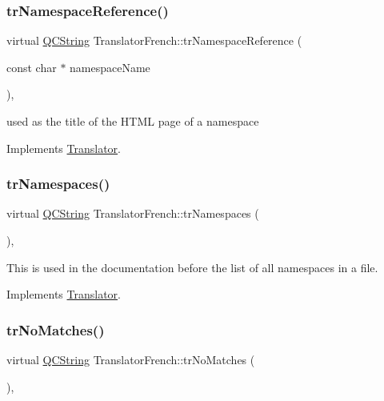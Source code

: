 \subsubsection{\texorpdfstring{trNamespaceReference()}{trNamespaceReference()}}
{\footnotesize\ttfamily virtual \mbox{\hyperlink{class_q_c_string}{Q\+C\+String}} Translator\+French\+::tr\+Namespace\+Reference (\begin{DoxyParamCaption}\item[{const char $\ast$}]{namespace\+Name }\end{DoxyParamCaption})\hspace{0.3cm}{\ttfamily [inline]}, {\ttfamily [virtual]}}

used as the title of the H\+T\+ML page of a namespace 

Implements \mbox{\hyperlink{class_translator}{Translator}}.

\mbox{\label{class_translator_french_ad269ac85f148854cc36b48693a18ab6b}} 
\subsubsection{\texorpdfstring{trNamespaces()}{trNamespaces()}}
{\footnotesize\ttfamily virtual \mbox{\hyperlink{class_q_c_string}{Q\+C\+String}} Translator\+French\+::tr\+Namespaces (\begin{DoxyParamCaption}{ }\end{DoxyParamCaption})\hspace{0.3cm}{\ttfamily [inline]}, {\ttfamily [virtual]}}

This is used in the documentation before the list of all namespaces in a file. 

Implements \mbox{\hyperlink{class_translator}{Translator}}.

\mbox{\label{class_translator_french_adcf727a9353edaab63f0d93c59eb4973}} 
\subsubsection{\texorpdfstring{trNoMatches()}{trNoMatches()}}
{\footnotesize\ttfamily virtual \mbox{\hyperlink{class_q_c_string}{Q\+C\+String}} Translator\+French\+::tr\+No\+Matches (\begin{DoxyParamCaption}{ }\end{DoxyParamCaption})\hspace{0.3cm}{\ttfamily [inline]}, {\ttfamily [virtual]}}

